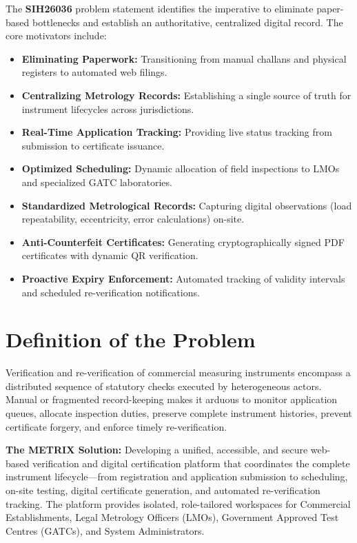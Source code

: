 \documentclass[11pt,a4paper]{article}
\begin{document}
The \textbf{SIH26036} problem statement identifies the imperative to eliminate paper-based bottlenecks and establish an authoritative, centralized digital record. The core motivators include:
\begin{itemize}
    \item \textbf{Eliminating Paperwork:} Transitioning from manual challans and physical registers to automated web filings.
    \item \textbf{Centralizing Metrology Records:} Establishing a single source of truth for instrument lifecycles across jurisdictions.
    \item \textbf{Real-Time Application Tracking:} Providing live status tracking from submission to certificate issuance.
    \item \textbf{Optimized Scheduling:} Dynamic allocation of field inspections to LMOs and specialized GATC laboratories.
    \item \textbf{Standardized Metrological Records:} Capturing digital observations (load repeatability, eccentricity, error calculations) on-site.
    \item \textbf{Anti-Counterfeit Certificates:} Generating cryptographically signed PDF certificates with dynamic QR verification.
    \item \textbf{Proactive Expiry Enforcement:} Automated tracking of validity intervals and scheduled re-verification notifications.
\end{itemize}

\section{Definition of the Problem}
Verification and re-verification of commercial measuring instruments encompass a distributed sequence of statutory checks executed by heterogeneous actors. Manual or fragmented record-keeping makes it arduous to monitor application queues, allocate inspection duties, preserve complete instrument histories, prevent certificate forgery, and enforce timely re-verification.

\textbf{The METRIX Solution:} Developing a unified, accessible, and secure web-based verification and digital certification platform that coordinates the complete instrument lifecycle—from registration and application submission to scheduling, on-site testing, digital certificate generation, and automated re-verification tracking. The platform provides isolated, role-tailored workspaces for Commercial Establishments, Legal Metrology Officers (LMOs), Government Approved Test Centres (GATCs), and System Administrators.
\end{document}
